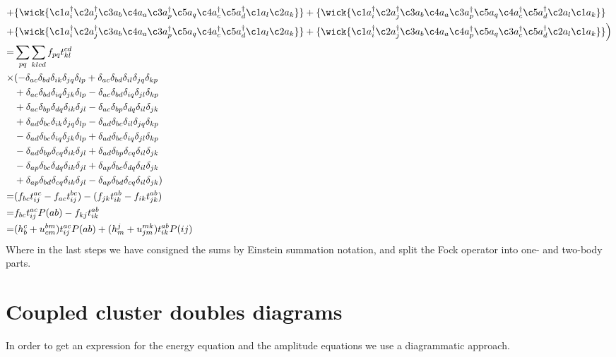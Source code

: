 \documentclass[
    a4paper, aps, twocolumn, floatfix, superscriptaddress,
    nofootinbib]{revtex4-1}
\newcommand{\1}{\mathds{1}}
\begin{document}
\begin{equation}
\begin{aligned}
		        + &\{\wick{\c1 a^\dagger_i \c2 a^\dagger_j \c3 a_b \c4 a_a \c3 a^\dagger_p \c5 a_q \c4 a^\dagger_c \c5 a^\dagger_d \c1 a_l \c2 a_k } \}
		          +\{\wick{\c1 a^\dagger_i \c2 a^\dagger_j \c3 a_b \c4 a_a \c3 a^\dagger_p \c5 a_q \c4 a^\dagger_c \c5 a^\dagger_d \c2 a_l \c1 a_k } \} \\
		        + &\{\wick{\c1 a^\dagger_i \c2 a^\dagger_j \c3 a_b \c4 a_a \c3 a^\dagger_p \c5 a_q \c4 a^\dagger_c \c5 a^\dagger_d \c1 a_l \c2 a_k } \}
		          + \{\wick{\c1 a^\dagger_i \c2 a^\dagger_j \c3 a_b \c4 a_a \c4 a^\dagger_p \c5 a_q \c3 a^\dagger_c \c5 a^\dagger_d \c2 a_l \c1 a_k } \}
				\Big) \\
				=& \sum_{pq}\sum_{klcd}f_{pq} t_{kl}^{cd} \\
				\times&( - \delta_{a c} \delta_{b d} \delta_{i k} \delta_{j q} \delta_{l p} + \delta_{a c} \delta_{b d} \delta_{i l} \delta_{j q} \delta_{k p}  \\
				 \ &+ \delta_{a c} \delta_{b d} \delta_{i q} \delta_{j k} \delta_{l p} - \delta_{a c} \delta_{b d} \delta_{i q} \delta_{j l} \delta_{k p} \\
				 \ &+ \delta_{a c} \delta_{b p} \delta_{d q} \delta_{i k} \delta_{j l} - \delta_{a c} \delta_{b p} \delta_{d q} \delta_{i l} \delta_{j k} \\
				 \ & + \delta_{a d} \delta_{b c} \delta_{i k} \delta_{j q} \delta_{l p} - \delta_{a d} \delta_{b c} \delta_{i l} \delta_{j q} \delta_{k p} \\
				 \ &- \delta_{a d} \delta_{b c} \delta_{i q} \delta_{j k} \delta_{l p} + \delta_{a d} \delta_{b c} \delta_{i q} \delta_{j l} \delta_{k p} \\
				 \ &- \delta_{a d} \delta_{b p} \delta_{c q} \delta_{i k} \delta_{j l} + \delta_{a d} \delta_{b p} \delta_{c q} \delta_{i l} \delta_{j k} \\
				 \ &- \delta_{a p} \delta_{b c} \delta_{d q} \delta_{i k} \delta_{j l} + \delta_{a p} \delta_{b c} \delta_{d q} \delta_{i l} \delta_{j k} \\
				 \ &+ \delta_{a p} \delta_{b d} \delta_{c q} \delta_{i k} \delta_{j l} - \delta_{a p} \delta_{b d} \delta_{c q} \delta_{i l} \delta_{j k}) \\
				 =& (f_{bc}t^{ac}_{ij} - f_{ac}t^{bc}_{ij}) - (f_{jk}t^{ab}_{ik} - f_{ik}t^{ab}_{jk}) \\
				 =& f_{bc}t^{ac}_{ij}P(ab) - f_{kj}t^{ab}_{ik} \\
				 =& (h^c_b + u_{cm}^{bm})t_{ij}^{ac}P(ab) + (h^j_m + u_{jm}^{mk})t_{ik}^{ab}P(ij)
		\end{aligned}
		\end{equation}		
		Where in the last steps we have consigned the sums by Einstein summation notation,
		and split the Fock operator into one- and two-body parts. 

\section{Coupled cluster doubles diagrams}
    In order to get an expression for the energy equation and the amplitude
    equations we use a diagrammatic approach.



\end{document}
